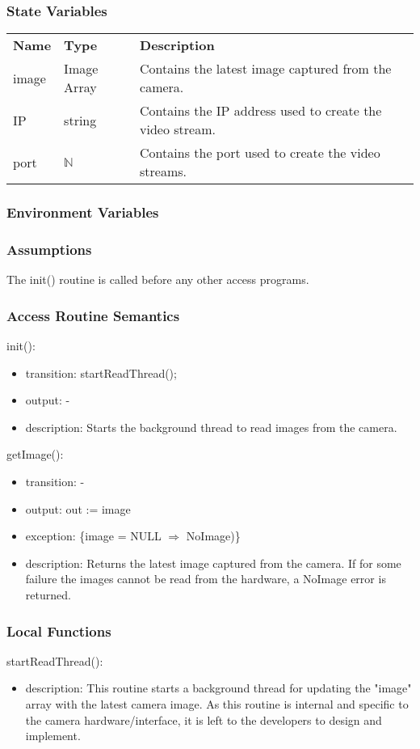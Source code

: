 \documentclass[12pt, titlepage]{article}
\begin{document}
\subsubsection{State Variables}
\begin{center}
\begin{tabular}{p{3 cm} p{3cm} p{6.5cm} }
\hline
\textbf{Name} & \textbf{Type} & \textbf{Description}  \\
image & Image Array & Contains the latest image captured from the camera. \\
IP & string & Contains the IP address used to create the video stream. \\
port & $\mathbb{N}$ & Contains the port used to create the video streams. \\
\hline
\hline
\end{tabular}
\end{center}
\subsubsection{Environment Variables}
\subsubsection{Assumptions}
The init() routine is called before any other access programs.
\subsubsection{Access Routine Semantics}
\noindent init():
\begin{itemize}
\item transition: startReadThread();
\item output: -
\item description: Starts the background thread to read images from the camera.
\end{itemize}
\noindent getImage():
\begin{itemize}
\item transition: -
\item output: out := image 
\item exception: \{image = NULL $\Rightarrow$ NoImage)\}
\item description: Returns the latest image captured from the camera. If for some failure the images cannot be read from the hardware, a NoImage error is returned.  
\end{itemize}
\subsubsection{Local Functions}
\noindent startReadThread():
\begin{itemize}
\item description: This routine starts a background thread for updating the "image" array with the latest camera image. As this routine is internal and specific to the camera hardware/interface, it is left to the developers to design and implement. 
\end{itemize}
\newpage
\end{document}
